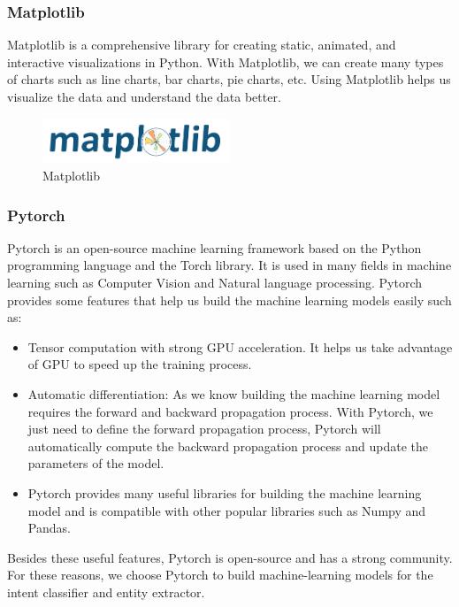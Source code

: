 \subsubsection{Matplotlib}
Matplotlib is a comprehensive library for creating static, animated, and interactive visualizations in Python. With Matplotlib, we can create many types of charts such as line charts, bar charts, pie charts, etc. Using Matplotlib helps us visualize the data and understand the data better.

\begin{figure}[ht]
    \centering
    \includegraphics[width=0.5\textwidth]{../Images/8.Technology_Stack/matplotlib_logo.png}
    \caption{Matplotlib}
    \label{fig:matplotlib}
\end{figure}

\subsubsection{Pytorch}
Pytorch is an open-source machine learning framework based on the Python programming language and the Torch library. It is used in many fields in machine learning such as Computer Vision and Natural language processing.  Pytorch provides some features that help us build the machine learning models easily such as:
\begin{itemize}
    \item Tensor computation with strong GPU acceleration. It helps us take advantage of GPU to speed up the training process.
    \item Automatic differentiation: As we know building the machine learning model requires the forward and backward propagation process. With Pytorch, we just need to define the forward propagation process, Pytorch will automatically compute the backward propagation process and update the parameters of the model.
    \item Pytorch provides many useful libraries for building the machine learning model and is compatible with other popular libraries such as Numpy and Pandas.
\end{itemize}

\noindent Besides these useful features, Pytorch is open-source and has a strong community. For these reasons, we choose Pytorch to build machine-learning models for the intent classifier and entity extractor.


